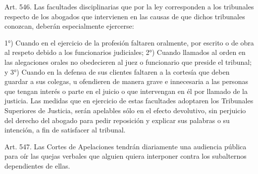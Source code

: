     Art. 546. Las facultades disciplinarias que por la ley corresponden a los tribunales respecto de los abogados que intervienen en las causas de que dichos tribunales conozcan, deberán especialmente ejercerse:

    1°) Cuando en el ejercicio de la profesión faltaren oralmente, por escrito o de obra al respeto debido a los funcionarios judiciales;
    2°) Cuando llamados al orden en las alegaciones orales no obedecieren al juez o funcionario que preside el tribunal; y
    3°) Cuando en la defensa de sus clientes faltaren a la cortesía que deben guardar a sus colegas, u ofendieren de manera grave e innecesaria a las personas que tengan interés o parte en el juicio o que intervengan en él por llamado de la justicia.
    Las medidas que en ejercicio de estas facultades adoptaren los Tribunales Superiores de Justicia, serán apelables sólo en el efecto devolutivo, sin perjuicio del derecho del abogado para pedir reposición y explicar sus palabras o su intención, a fin de satisfacer al tribunal.

    Art. 547. Las Cortes de Apelaciones tendrán diariamente una audiencia pública para oír las quejas verbales que alguien quiera interponer contra los subalternos dependientes de ellas.

